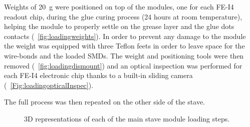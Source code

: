 Weights of 20~g were positioned on top of the modules, one for each FE-I4 readout chip, during the glue curing process (24 hours at room temperature), helping the module to properly settle on the grease layer and the glue dots contacts (~\ref{fig:loadingweights}). In order to prevent any damage to the module the weight was equipped with three Teflon feets in order to leave space for the wire-bonds and the loaded SMDs. The weight and positioning tools were then removed (~\ref{fig:loadingdismount}) and an optical inspection was performed for each FE-I4 electronic chip thanks to a built-in sliding camera (~\ref{Fig:loadingopticalInspec}).

The full process was then repeated on the other side of the stave.

\begin{figure}
	\centering
	\null\hfill
	\hfill
	\hfill
	\hfill\null
        \caption{3D representations of each of the main stave module loading steps.}
        \label{fig:moduleloading}
\end{figure}

